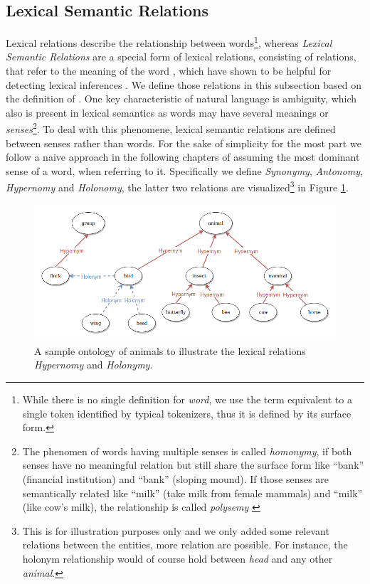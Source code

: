 \subsection{Lexical Semantic Relations}\label{sec:word_relations}
Lexical relations describe the relationship between words\footnote{While there is no single definition for \textit{word}, we use the term equivalent to a single token identified by typical tokenizers, thus it is defined by its surface form.}, whereas \textit{Lexical Semantic Relations} are a special form of lexical relations, consisting of relations, that refer to the meaning of the word \citep{murphy2003semantic}, which have shown to be helpful for detecting lexical inferences \citep{dagan2009recognizing}. We define those relations in this subsection based on the definition of \cite{Jurafsky2008May}. One key characteristic of natural language is ambiguity, which also is present in lexical semantics as words may have several meanings or \textit{senses}\footnote{The phenomen of words having multiple senses is called \textit{homonymy}, if both senses have no meaningful relation but still share the surface form like ``bank'' (financial institution) and ``bank'' (sloping mound). If those senses are semantically related like ``milk'' (take milk from female mammals) and ``milk'' (like cow's milk), the relationship is called \textit{polysemy} \citep{Jurafsky2008May}}. To deal with this phenomene, lexical semantic relations are defined between senses rather than words. For the sake of simplicity for the most part we follow a naive approach in the following chapters of assuming the most dominant sense of a word, when referring to it. Specifically we define \textit{Synonymy}, \textit{Antonomy}, \textit{Hypernomy} and \textit{Holonomy}, the latter two relations are visualized\footnote{This is for illustration purposes only and we only added some relevant relations between the entities, more relation are possible. For instance, the holonym relationship would of course hold between \textit{head} and any other \textit{animal}.} in Figure \ref{fig:lexical_resources}.
\begin{figure}[tph!]
\centering
	\includegraphics[totalheight=7cm]{fig/lexical_relations.png}
	\caption{A sample ontology of animals to illustrate the lexical relations \textit{Hypernomy} and \textit{Holonymy}.}
	\label{fig:lexical_resources}
\end{figure}
